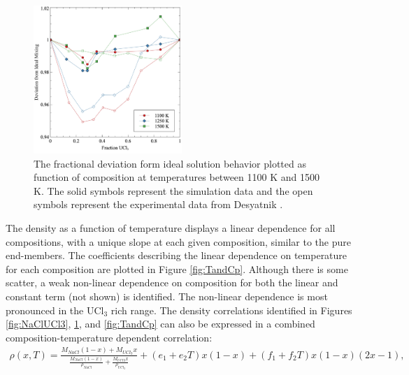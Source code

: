 \documentclass[preprint,3p,10pt,onecolumn,number,sort&compress]{elsarticle}
\begin{document}
{\begin{figure}[htb]
\centering
\includegraphics[width=0.5\textwidth]{fig8.jpg}
\caption{The fractional deviation form ideal solution behavior plotted as function of composition at temperatures between 1100 K and 1500 K. The solid symbols represent the simulation data and the open symbols represent the experimental data from Desyatnik \cite{Desyatnik}.}  
\label{fig:ideal}
\end{figure}

The density as a function of temperature displays a linear dependence for all compositions, with a unique slope at each given composition, similar to the pure end-members. The coefficients describing the linear dependence on temperature for each composition are plotted in Figure \ref{fig:TandCp}. Although there is some scatter, a weak non-linear dependence on composition for both the linear and constant term (not shown) is identified. The non-linear dependence is most pronounced in the UCl$_3$ rich range. The density correlations identified in Figures \ref{fig:NaClUCl3}, \ref{fig:ideal}, and \ref{fig:TandCp} can also be expressed in a combined composition-temperature dependent correlation:
\begin{equation}
\begin{split}
\rho(x,T)=\frac{M_{NaCl}(1-x)+M_{UCl_3}x}{\frac{M_{NaCl}(1-x)}{\rho_{NaCl}}+\frac{M_{UCl3}x}{\rho_{UCl_3}}}+(e_1+e_2T)x(1-x)+(f_1+f_2T)x(1-x)(2x-1), 
\label{eq:LS}
\end{split}
\end{equation}

}
\end{document}
